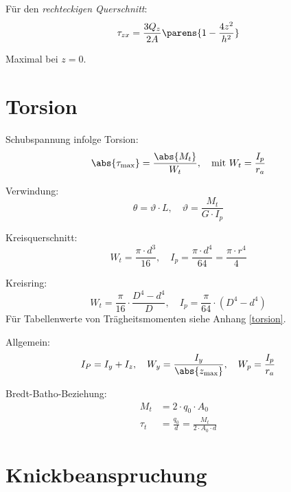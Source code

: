 	Für den \emph{rechteckigen Querschnitt}:
	\[
		\tau_{zx} = \frac{3 Q_z}{2A} \parens{1-\frac{4z^2}{h^2}}
	\]
	
	Maximal bei $z=0$.
	
\section{Torsion} %
	Schubspannung infolge Torsion:
	\begin{equation*}
		\abs{\tau_{\text{max}}} = \frac{\abs{M_t}}{W_t}, \quad \text{mit } W_t = \frac{I_p}{r_a}
	\end{equation*}
	
	Verwindung:
	\begin{equation*}
		\theta = \vartheta \cdot L , \quad \vartheta = \frac{M_t}{G\cdot I_p}
	\end{equation*}
	
	Kreisquerschnitt:
	\begin{equation*}
		W_t = \frac{\pi \cdot d^3}{16}, \quad I_p = \frac{\pi \cdot d^4}{64}=\frac{\pi \cdot r^4}{4}
	\end{equation*}
	
	Kreisring:
	\begin{equation*}
		W_t = \frac{\pi}{16}\cdot\frac{D^4-d^4}{D}, \quad I_p = \frac{\pi}{64}\cdot (D^4 -d^4)
	\end{equation*}
	Für Tabellenwerte von Trägheitsmomenten siehe Anhang \ref{torsion}.
	
	Allgemein:
	\begin{equation*}
		I_P = I_y + I_z, \quad W_y = \frac{I_y}{\abs{z_{\text{max}}}}, \quad W_p = \frac{I_p}{r_a}
	\end{equation*}
	
	Bredt-Batho-Beziehung:
	\begin{align*}
		M_t &= 2 \cdot q_0 \cdot A_0 \\
		\tau_t &= \frac{q_0}{d} = \frac{M_t}{2 \cdot A_0 \cdot d}
	\end{align*}
\section{Knickbeanspruchung} %
	
